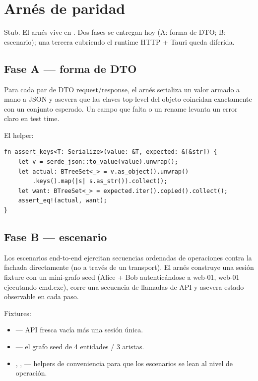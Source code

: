 \chapter{Arnés de paridad}
\label{ch:parity-harness}

\begin{note}
Stub. El arnés vive en
. Dos fases se
entregan hoy (A: forma de DTO; B: escenario); una tercera
cubriendo el runtime HTTP + Tauri queda diferida.
\end{note}

\section{Fase A --- forma de DTO}

Para cada par de DTO request/response, el arnés serializa un
valor armado a mano a JSON y asevera que las claves top-level
del objeto coincidan exactamente con un conjunto esperado. Un
campo que falta o un rename levanta un error claro en test time.

El helper:

\begin{lstlisting}[style=rust]
fn assert_keys<T: Serialize>(value: &T, expected: &[&str]) {
    let v = serde_json::to_value(value).unwrap();
    let actual: BTreeSet<_> = v.as_object().unwrap()
        .keys().map(|s| s.as_str()).collect();
    let want: BTreeSet<_> = expected.iter().copied().collect();
    assert_eq!(actual, want);
}
\end{lstlisting}

\section{Fase B --- escenario}

Los escenarios end-to-end ejercitan secuencias ordenadas de
operaciones contra la fachada directamente (no a través de un
transport). El arnés construye una sesión fixture con un
mini-grafo seed (Alice + Bob autenticándose a web-01, web-01
ejecutando cmd.exe), corre una secuencia de llamadas de API y
asevera estado observable en cada paso.

Fixtures:
\begin{itemize}
    \item {} --- API fresca vacía
        más una sesión única.
    \item {} --- el grafo
        seed de 4 entidades / 3 aristas.
    \item {}, ,  --- helpers de
        conveniencia para que los escenarios se lean al nivel
        de operación.
\end{itemize}

